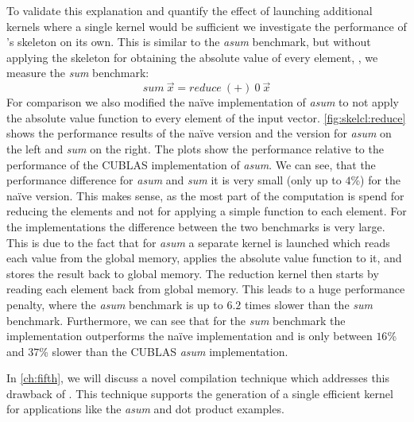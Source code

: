 To validate this explanation and quantify the effect of launching additional kernels where a single kernel would be sufficient we investigate the performance of \SkelCL's \reduce skeleton on its own.
This is similar to the \emph{asum} benchmark, but without applying the \map skeleton for obtaining the absolute value of every element, \ie, we measure the \emph{sum} benchmark:
\begin{equation}
  sum\ \vec{x} = reduce\ (+)\ 0\ \vec{x}
  \label{eq:sum}
\end{equation}
For comparison we also modified the na{\"i}ve \OpenCL implementation of \emph{asum} to not apply the absolute value function to every element of the input vector.
\autoref{fig:skelcl:reduce} shows the performance results of the na{\"i}ve \OpenCL version and the \SkelCL version for \emph{asum} on the left and \emph{sum} on the right.
The plots show the performance relative to the performance of the CUBLAS implementation of \emph{asum}.
We can see, that the performance difference for \emph{asum} and \emph{sum} it is very small (only up to $4$\%) for the na{\"i}ve \OpenCL version.
This makes sense, as the most part of the computation is spend for reducing the elements and not for applying a simple function to each element.
For the \SkelCL implementations the difference between the two benchmarks is very large.
This is due to the fact that for \emph{asum} a separate \OpenCL kernel is launched which reads each value from the global memory, applies the absolute value function to it, and stores the result back to global memory.
The reduction kernel then starts by reading each element back from global memory.
This leads to a huge performance penalty, where the \emph{asum} benchmark is up to $6.2$ times slower than the \emph{sum} benchmark.
Furthermore, we can see that for the \emph{sum} benchmark the \SkelCL implementation outperforms the na{\"i}ve \OpenCL implementation and is only between $16$\% and $37$\% slower than the CUBLAS \emph{asum} implementation.

In \autoref{ch:fifth}, we will discuss a novel compilation technique which addresses this drawback of \SkelCL.
This technique supports the generation of a single efficient \OpenCL kernel for applications like the \emph{asum} and dot product examples.

